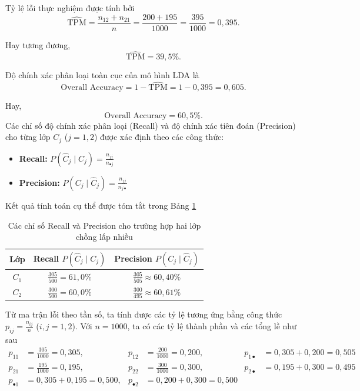 Tỷ lệ lỗi thực nghiệm được tính bởi
\[
\widehat{\mathrm{TPM}}
=
\frac{n_{12}+n_{21}}{n}
=
\frac{200+195}{1000}
=
\frac{395}{1000}
=
0{,}395.
\]

Hay tương đương,
\[
\widehat{\mathrm{TPM}}=39{,}5\%.
\]

Độ chính xác phân loại toàn cục của mô hình LDA là
\[
\text{Overall Accuracy}
=
1-\widehat{\mathrm{TPM}}
=
1-0{,}395
=
0{,}605.
\]

Hay,
\[
\text{Overall Accuracy}=60{,}5\%.
\]
Các chỉ số độ chính xác phân loại (Recall) và độ chính xác tiên đoán (Precision) cho từng lớp $C_j$ ($j = 1, 2$) được xác định theo các công thức:
\begin{itemize}
	\item \textbf{Recall:} $P(\hat{C}_j\mid C_j) = \frac{n_{jj}}{n_{\bullet j}}$
	\item \textbf{Precision:} $P(C_j\mid \hat{C}_j) = \frac{n_{jj}}{n_{j\bullet}}$
\end{itemize}

Kết quả tính toán cụ thể được tóm tắt trong Bảng \ref{tab:metrics_summary}

\begin{table}[htpb]
	\centering
	\renewcommand{\arraystretch}{1.5}
	\begin{tabular}{|c|c|c|}
		\hline
		\textbf{Lớp} & \textbf{Recall} $P(\hat{C}_j \mid C_j)$ & \textbf{Precision} $P(C_j \mid \hat{C}_j)$ \\
		\hline
		\textbf{$C_1$} & $\frac{305}{500} = 61{,}0\%$ & $\frac{305}{505} \approx 60{,}40\%$ \\
		\hline
		\textbf{$C_2$} & $\frac{300}{500} = 60{,}0\%$ & $\frac{300}{495} \approx 60{,}61\%$ \\
		\hline
	\end{tabular}
	\caption{Các chỉ số Recall và Precision cho trường hợp hai lớp chồng lấp nhiều}
	\label{tab:metrics_summary}
\end{table}

Từ ma trận lỗi theo tần số, ta tính được các tỷ lệ tương ứng bằng công thức $p_{ij} = \frac{n_{ij}}{n}$ ($i,j=1,2$). Với $n=1000$, ta có các tỷ lệ thành phần và các tổng lề như sau
\begin{align*}
	p_{11} &= \frac{305}{1000} = 0{,}305, & p_{12} &= \frac{200}{1000} = 0{,}200, & p_{1\bullet} &= 0{,}305 + 0{,}200 = 0{,}505 \\
	p_{21} &= \frac{195}{1000} = 0{,}195, & p_{22} &= \frac{300}{1000} = 0{,}300, & p_{2\bullet} &= 0{,}195 + 0{,}300 = 0{,}495 \\
	p_{\bullet 1} &= 0{,}305 + 0{,}195 = 0{,}500, & p_{\bullet 2} &= 0{,}200 + 0{,}300 = 0{,}500
\end{align*}

